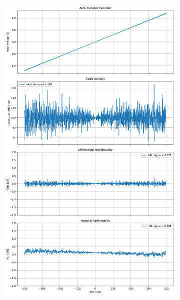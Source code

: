 \documentclass[varwidth]{standalone}
\begin{document}
\begin{figure}
\begin{subfigure}{0.32\textwidth}
    \includegraphics[width=\textwidth]{behavioral_10b_refnoise_nonlinearity.pdf}
\end{subfigure}
\begin{subfigure}{0.32\textwidth}

\end{subfigure}
\end{figure}
\end{document}
